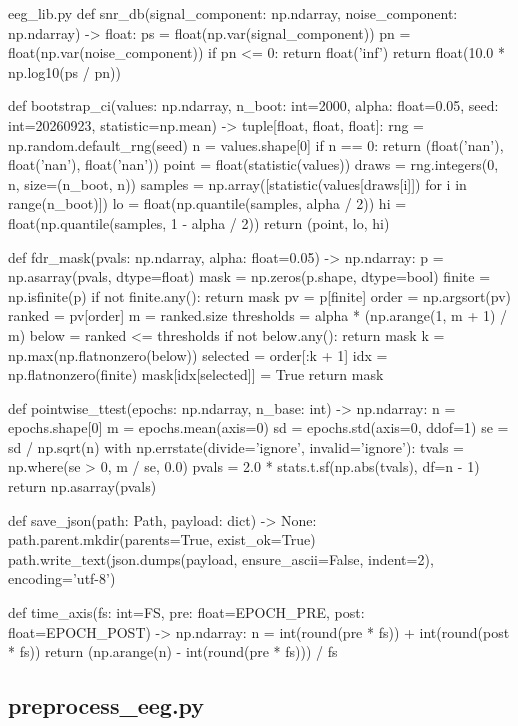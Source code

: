 \documentclass[bwprint]{gmcmthesis}
\begin{document}
\begin{appendices}
\begin{Python}{eeg\_lib.py}
def snr_db(signal_component: np.ndarray, noise_component: np.ndarray) -> float:
    ps = float(np.var(signal_component))
    pn = float(np.var(noise_component))
    if pn <= 0:
        return float('inf')
    return float(10.0 * np.log10(ps / pn))

def bootstrap_ci(values: np.ndarray, n_boot: int=2000, alpha: float=0.05, seed: int=20260923, statistic=np.mean) -> tuple[float, float, float]:
    rng = np.random.default_rng(seed)
    n = values.shape[0]
    if n == 0:
        return (float('nan'), float('nan'), float('nan'))
    point = float(statistic(values))
    draws = rng.integers(0, n, size=(n_boot, n))
    samples = np.array([statistic(values[draws[i]]) for i in range(n_boot)])
    lo = float(np.quantile(samples, alpha / 2))
    hi = float(np.quantile(samples, 1 - alpha / 2))
    return (point, lo, hi)

def fdr_mask(pvals: np.ndarray, alpha: float=0.05) -> np.ndarray:
    p = np.asarray(pvals, dtype=float)
    mask = np.zeros(p.shape, dtype=bool)
    finite = np.isfinite(p)
    if not finite.any():
        return mask
    pv = p[finite]
    order = np.argsort(pv)
    ranked = pv[order]
    m = ranked.size
    thresholds = alpha * (np.arange(1, m + 1) / m)
    below = ranked <= thresholds
    if not below.any():
        return mask
    k = np.max(np.flatnonzero(below))
    selected = order[:k + 1]
    idx = np.flatnonzero(finite)
    mask[idx[selected]] = True
    return mask

def pointwise_ttest(epochs: np.ndarray, n_base: int) -> np.ndarray:
    n = epochs.shape[0]
    m = epochs.mean(axis=0)
    sd = epochs.std(axis=0, ddof=1)
    se = sd / np.sqrt(n)
    with np.errstate(divide='ignore', invalid='ignore'):
        tvals = np.where(se > 0, m / se, 0.0)
    pvals = 2.0 * stats.t.sf(np.abs(tvals), df=n - 1)
    return np.asarray(pvals)

def save_json(path: Path, payload: dict) -> None:
    path.parent.mkdir(parents=True, exist_ok=True)
    path.write_text(json.dumps(payload, ensure_ascii=False, indent=2), encoding='utf-8')

def time_axis(fs: int=FS, pre: float=EPOCH_PRE, post: float=EPOCH_POST) -> np.ndarray:
    n = int(round(pre * fs)) + int(round(post * fs))
    return (np.arange(n) - int(round(pre * fs))) / fs
\end{Python}

\subsection{preprocess\_eeg.py}


\end{appendices}
\end{document}
